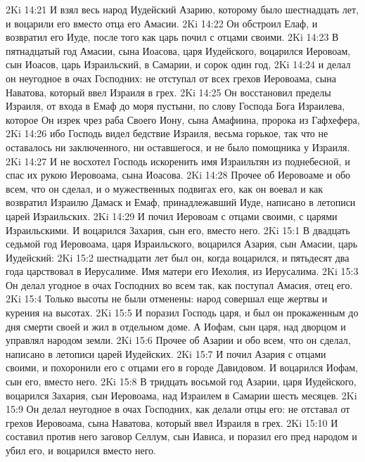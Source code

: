 \vs 2Ki 14:21 И взял весь народ Иудейский Азарию, которому было шестнадцать лет, и воцарили его вместо отца его Амасии.
\vs 2Ki 14:22 Он обстроил Елаф, и возвратил его Иуде, после того как царь почил с отцами своими.
\rsbpar\vs 2Ki 14:23 В пятнадцатый год Амасии, сына Иоасова, царя Иудейского, воцарился Иеровоам, сын Иоасов, царь Израильский, в Самарии, и  сорок один год,
\vs 2Ki 14:24 и делал он неугодное в очах Господних: не отступал от всех грехов Иеровоама, сына Наватова, который ввел Израиля в грех.
\vs 2Ki 14:25 Он восстановил пределы Израиля, от входа в Емаф до моря пустыни, по слову Господа Бога Израилева, которое Он изрек чрез раба Своего Иону, сына Амафиина, пророка из Гафхефера,
\vs 2Ki 14:26 ибо Господь видел бедствие Израиля, весьма горькое, так что не оставалось ни заключенного, ни оставшегося, и не было помощника у Израиля.
\vs 2Ki 14:27 И не восхотел Господь искоренить имя Израильтян из поднебесной, и спас их рукою Иеровоама, сына Иоасова.
\rsbpar\vs 2Ki 14:28 Прочее об Иеровоаме и обо всем, что он сделал, и о мужественных подвигах его, как он воевал и как возвратил Израилю Дамаск и Емаф, принадлежавший Иуде, написано в летописи царей Израильских.
\vs 2Ki 14:29 И почил Иеровоам с отцами своими, с царями Израильскими. И воцарился Захария, сын его, вместо него.
\vs 2Ki 15:1 В двадцать седьмой год Иеровоама, царя Израильского, воцарился Азария, сын Амасии, царь Иудейский:
\vs 2Ki 15:2 шестнадцати лет был он, когда воцарился, и пятьдесят два года царствовал в Иерусалиме. Имя матери его Иехолия, из Иерусалима.
\vs 2Ki 15:3 Он делал угодное в очах Господних во всем так, как поступал Амасия, отец его.
\vs 2Ki 15:4 Только высоты не были отменены: народ совершал еще жертвы и курения на высотах.
\vs 2Ki 15:5 И поразил Господь царя, и был он прокаженным до дня смерти своей и жил в отдельном доме. А Иофам, сын царя,  над дворцом и управлял народом земли.
\rsbpar\vs 2Ki 15:6 Прочее об Азарии и обо всем, что он сделал, написано в летописи царей Иудейских.
\vs 2Ki 15:7 И почил Азария с отцами своими, и похоронили его с отцами его в городе Давидовом. И воцарился Иофам, сын его, вместо него.
\rsbpar\vs 2Ki 15:8 В тридцать восьмой год Азарии, царя Иудейского, воцарился Захария, сын Иеровоама, над Израилем в Самарии  шесть месяцев.
\vs 2Ki 15:9 Он делал неугодное в очах Господних, как делали отцы его: не отставал от грехов Иеровоама, сына Наватова, который ввел Израиля в грех.
\vs 2Ki 15:10 И составил против него заговор Селлум, сын Иависа, и поразил его пред народом и убил его, и воцарился вместо него.
